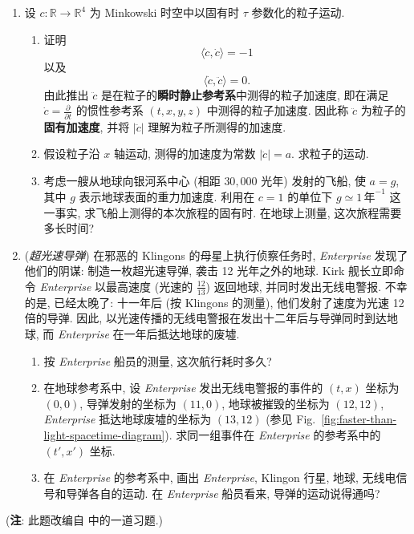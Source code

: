 \begin{RiemannExercise}
\begin{enumerate}[label=(\arabic*),ref=\arabic*,leftmargin=*]
\begin{enumerate}[label=(\alph*),leftmargin=*]
\end{enumerate}
\item\label{ex:proper-acceleration-and-spaceship}
设 $c:\mathbb{R}\to\mathbb{R}^4$ 为 Minkowski 时空中以固有时 $\tau$ 参数化的粒子运动.
\begin{enumerate}[label=(\alph*),leftmargin=*]
\item 证明
\[
  \langle\dot c,\dot c\rangle=-1
\]
以及
\[
  \langle\dot c,\ddot c\rangle=0.
\]
由此推出 $\ddot c$ 是在粒子的\textbf{瞬时静止参考系}中测得的粒子加速度, 即在满足 $\dot c=\frac{\partial}{\partial t}$ 的惯性参考系 $(t,x,y,z)$ 中测得的粒子加速度. 因此称 $\ddot c$ 为粒子的\textbf{固有加速度}, 并将 $|\ddot c|$ 理解为粒子所测得的加速度.
\item 假设粒子沿 $x$ 轴运动, 测得的加速度为常数 $|\ddot c|=a$. 求粒子的运动.
\item 考虑一艘从地球向银河系中心 (相距 $30{,}000$ 光年) 发射的飞船, 使 $a=g$, 其中 $g$ 表示地球表面的重力加速度. 利用在 $c=1$ 的单位下 $g\simeq1\,\text{年}^{-1}$ 这一事实, 求飞船上测得的本次旅程的固有时. 在地球上测量, 这次旅程需要多长时间?
\end{enumerate}
\item\label{ex:faster-than-light-paradox}
(\emph{超光速导弹}) 在邪恶的 Klingons 的母星上执行侦察任务时, \emph{Enterprise} 发现了他们的阴谋: 制造一枚超光速导弹, 袭击 12 光年之外的地球. Kirk 舰长立即命令 \emph{Enterprise} 以最高速度 (光速的 $\frac{12}{13}$) 返回地球, 并同时发出无线电警报. 不幸的是, 已经太晚了: 十一年后 (按 Klingons 的测量), 他们发射了速度为光速 12 倍的导弹. 因此, 以光速传播的无线电警报在发出十二年后与导弹同时到达地球, 而 \emph{Enterprise} 在一年后抵达地球的废墟.
\begin{enumerate}[label=(\alph*),leftmargin=*]
\item 按 \emph{Enterprise} 船员的测量, 这次航行耗时多久?
\item 在地球参考系中, 设 \emph{Enterprise} 发出无线电警报的事件的 $(t,x)$ 坐标为 $(0,0)$, 导弹发射的坐标为 $(11,0)$, 地球被摧毁的坐标为 $(12,12)$, \emph{Enterprise} 抵达地球废墟的坐标为 $(13,12)$ (参见 Fig.~\ref{fig:faster-than-light-spacetime-diagram}). 求同一组事件在 \emph{Enterprise} 的参考系中的 $(t',x')$ 坐标.
\item 在 \emph{Enterprise} 的参考系中, 画出 \emph{Enterprise}, Klingon 行星, 地球, 无线电信号和导弹各自的运动. 在 \emph{Enterprise} 船员看来, 导弹的运动说得通吗?
\end{enumerate}
\end{enumerate}
(\textbf{注}: 此题改编自  中的一道习题.)
\end{RiemannExercise}
